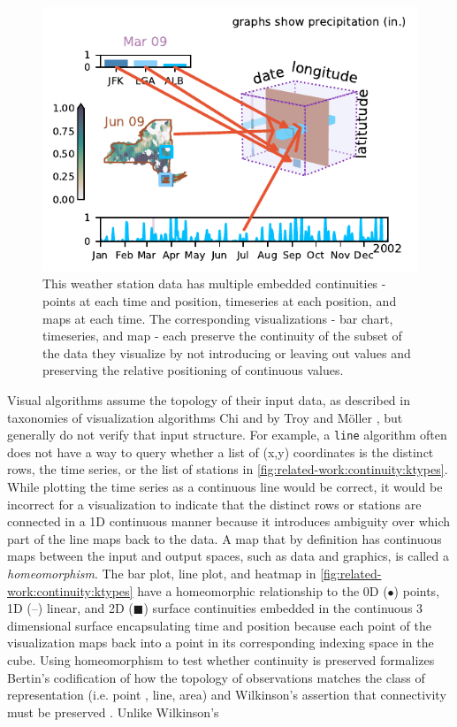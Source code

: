 \documentclass[review]{vgtc}
\theoremstyle{definition}
\theoremstyle{remark}
\begin{document}
\begin{figure}[H]
  \includegraphics[width=1\columnwidth]{k_different_types.pdf}
  \caption{This weather station data has multiple embedded continuities - points at each time and position, timeseries at each position, and maps at each time. The corresponding visualizations - bar chart, timeseries, and map - each preserve the continuity of the subset of the data they visualize by not introducing or leaving out values and preserving the relative positioning of continuous values.}
%
  \label{fig:related-work:continuity:ktypes}
\end{figure}

Visual algorithms assume the topology of their input data, as described in taxonomies of visualization algorithms Chi\cite{chiTaxonomyVisualizationTechniques2000} and by Troy and M\"{o}ller \cite{toryRethinkingVisualizationHighlevel2004}, but generally do not verify that input structure. For example, a \texttt{line} algorithm often does not have a way to query whether a list of (x,y) coordinates is the distinct rows, the time series, or the list of stations in \autoref{fig:related-work:continuity:ktypes}. While plotting the time series as a continuous line would be correct, it would be incorrect for a visualization to indicate that the distinct rows or stations are connected in a 1D continuous manner because it introduces ambiguity over which part of the line maps back to the data. A map that by definition has continuous maps between the input and output spaces, such as data and graphics, is called a \textit{homeomorphism}\cite{riehlCategoryTheoryContext}. The bar plot, line plot, and heatmap in \autoref{fig:related-work:continuity:ktypes} have a homeomorphic relationship to the 0D ($\bullet$) points, 1D (--) linear, and 2D ($\blacksquare$) surface continuities embedded in the continuous 3 dimensional surface encapsulating time and position because each point of the visualization maps back into a point in its corresponding indexing space in the cube. Using homeomorphism to test whether continuity is preserved formalizes Bertin's codification of how the topology of observations matches the class of representation (i.e. point , line, area) \cite{bertinSemiologyGraphicsDiagrams2011} and Wilkinson's assertion that connectivity must be preserved \cite{wilkinsonGrammarGraphics2005}. Unlike Wilkinson's
\end{document}
